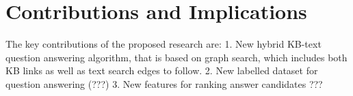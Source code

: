 

\section{Contributions and Implications}

The key contributions of the proposed research are:
1. New hybrid KB-text question answering algorithm, that is based on graph search, which includes both KB links as well as text search edges to follow.
2. New labelled dataset for question answering (???)
3. New features for ranking answer candidates ???
